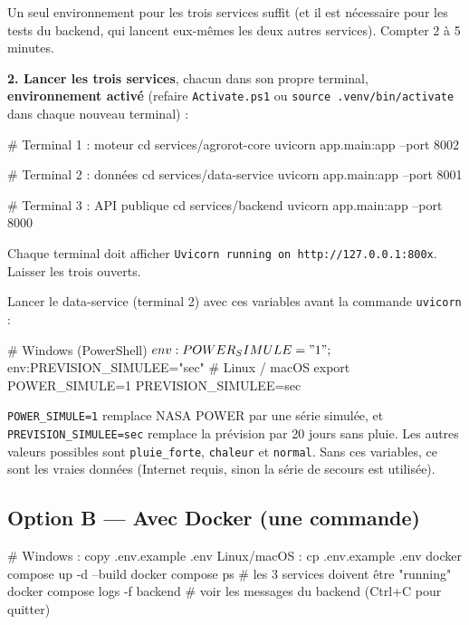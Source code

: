 \documentclass[11pt,a4paper]{article}
\begin{document}
Un seul environnement pour les trois services suffit (et il est nécessaire pour les tests du backend, qui lancent
eux-mêmes les deux autres services). Compter 2 à 5 minutes.

\textbf{2. Lancer les trois services}, chacun dans son propre terminal, \textbf{environnement activé} (refaire
\texttt{Activate.ps1} ou \texttt{source .venv/bin/activate} dans chaque nouveau terminal) :

\begin{code}
# Terminal 1 : moteur
cd services/agrorot-core
uvicorn app.main:app --port 8002

# Terminal 2 : données
cd services/data-service
uvicorn app.main:app --port 8001

# Terminal 3 : API publique
cd services/backend
uvicorn app.main:app --port 8000
\end{code}

Chaque terminal doit afficher \texttt{Uvicorn running on http://127.0.0.1:800x}. Laisser les trois ouverts.

\begin{attention}
Lancer le data-service (terminal 2) avec ces variables avant la commande \texttt{uvicorn} :
\begin{code}
# Windows (PowerShell)
$env:POWER_SIMULE="1"; $env:PREVISION_SIMULEE="sec"
# Linux / macOS
export POWER_SIMULE=1 PREVISION_SIMULEE=sec
\end{code}
\texttt{POWER\_SIMULE=1} remplace NASA POWER par une série simulée, et \texttt{PREVISION\_SIMULEE=sec} remplace la
prévision par 20 jours sans pluie. Les autres valeurs possibles sont \texttt{pluie\_forte}, \texttt{chaleur} et
\texttt{normal}. Sans ces variables, ce sont les vraies données (Internet requis, sinon la série de secours est utilisée).
\end{attention}

\subsection{Option B — Avec Docker (une commande)}

\begin{code}
# Windows : copy .env.example .env      Linux/macOS : cp .env.example .env
docker compose up -d --build
docker compose ps                  # les 3 services doivent être "running"
docker compose logs -f backend     # voir les messages du backend (Ctrl+C pour quitter)
\end{code}
\end{document}
